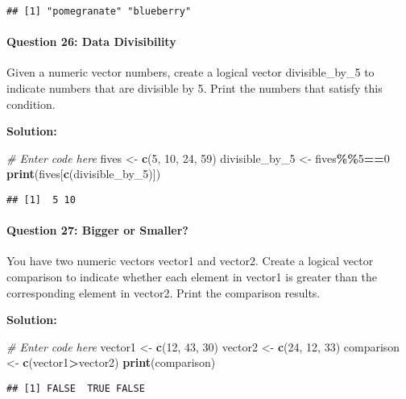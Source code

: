 \documentclass[
]{article}
\newenvironment{Shaded}{\begin{snugshade}}{\end{snugshade}}
\newcommand{\CommentTok}[1]{\textcolor[rgb]{0.56,0.35,0.01}{\textit{#1}}}
\newcommand{\DecValTok}[1]{\textcolor[rgb]{0.00,0.00,0.81}{#1}}
\newcommand{\FunctionTok}[1]{\textcolor[rgb]{0.13,0.29,0.53}{\textbf{#1}}}
\newcommand{\NormalTok}[1]{#1}
\newcommand{\OtherTok}[1]{\textcolor[rgb]{0.56,0.35,0.01}{#1}}
\newcommand{\SpecialCharTok}[1]{\textcolor[rgb]{0.81,0.36,0.00}{\textbf{#1}}}
\begin{document}
\begin{verbatim}
## [1] "pomegranate" "blueberry"
\end{verbatim}

\hypertarget{question-26-data-divisibility}{%
\paragraph{Question 26: Data
Divisibility}\label{question-26-data-divisibility}}

Given a numeric vector numbers, create a logical vector divisible\_by\_5
to indicate numbers that are divisible by 5. Print the numbers that
satisfy this condition.

\textbf{Solution:}

\begin{Shaded}
\begin{Highlighting}[]
\CommentTok{\# Enter code here}
\NormalTok{fives }\OtherTok{\textless{}{-}} \FunctionTok{c}\NormalTok{(}\DecValTok{5}\NormalTok{, }\DecValTok{10}\NormalTok{, }\DecValTok{24}\NormalTok{, }\DecValTok{59}\NormalTok{)}
\NormalTok{divisible\_by\_5 }\OtherTok{\textless{}{-}}\NormalTok{ fives}\SpecialCharTok{\%\%}\DecValTok{5}\SpecialCharTok{==}\DecValTok{0}
\FunctionTok{print}\NormalTok{(fives[}\FunctionTok{c}\NormalTok{(divisible\_by\_5)])}
\end{Highlighting}
\end{Shaded}

\begin{verbatim}
## [1]  5 10
\end{verbatim}

\hypertarget{question-27-bigger-or-smaller}{%
\paragraph{Question 27: Bigger or
Smaller?}\label{question-27-bigger-or-smaller}}

You have two numeric vectors vector1 and vector2. Create a logical
vector comparison to indicate whether each element in vector1 is greater
than the corresponding element in vector2. Print the comparison results.

\textbf{Solution:}

\begin{Shaded}
\begin{Highlighting}[]
\CommentTok{\# Enter code here}
\NormalTok{vector1 }\OtherTok{\textless{}{-}} \FunctionTok{c}\NormalTok{(}\DecValTok{12}\NormalTok{, }\DecValTok{43}\NormalTok{, }\DecValTok{30}\NormalTok{)}
\NormalTok{vector2 }\OtherTok{\textless{}{-}} \FunctionTok{c}\NormalTok{(}\DecValTok{24}\NormalTok{, }\DecValTok{12}\NormalTok{, }\DecValTok{33}\NormalTok{)}
\NormalTok{comparison }\OtherTok{\textless{}{-}} \FunctionTok{c}\NormalTok{(vector1}\SpecialCharTok{\textgreater{}}\NormalTok{vector2)}
\FunctionTok{print}\NormalTok{(comparison)}
\end{Highlighting}
\end{Shaded}

\begin{verbatim}
## [1] FALSE  TRUE FALSE
\end{verbatim}
\end{document}
